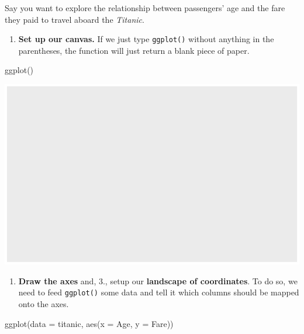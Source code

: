 \documentclass[
]{book}
\newenvironment{Shaded}{\begin{snugshade}}{\end{snugshade}}
\newcommand{\AttributeTok}[1]{\textcolor[rgb]{0.77,0.63,0.00}{#1}}
\newcommand{\FunctionTok}[1]{\textcolor[rgb]{0.00,0.00,0.00}{#1}}
\newcommand{\NormalTok}[1]{#1}
\providecommand{\tightlist}{%
  \setlength{\itemsep}{0pt}\setlength{\parskip}{0pt}}
\begin{document}
Say you want to explore the relationship between passengers' age and the fare they paid to travel aboard the \emph{Titanic}.

\begin{enumerate}
\def\labelenumi{(\arabic{enumi})}
\tightlist
\item
  \textbf{Set up our canvas.} If we just type \texttt{ggplot()} without anything in the parentheses, the function will just return a blank piece of paper.
\end{enumerate}

\begin{Shaded}
\begin{Highlighting}[]
\FunctionTok{ggplot}\NormalTok{()}
\end{Highlighting}
\end{Shaded}

\includegraphics{figures/unnamed-chunk-153-1.pdf}

\begin{enumerate}
\def\labelenumi{(\arabic{enumi})}
\setcounter{enumi}{1}
\tightlist
\item
  \textbf{Draw the axes} and, 3., setup our \textbf{landscape of coordinates}. To do so, we need to feed \texttt{ggplot()} some data and tell it which columns should be mapped onto the axes.
\end{enumerate}

\begin{Shaded}
\begin{Highlighting}[]
\FunctionTok{ggplot}\NormalTok{(}\AttributeTok{data =}\NormalTok{ titanic, }
       \FunctionTok{aes}\NormalTok{(}\AttributeTok{x =}\NormalTok{ Age, }\AttributeTok{y =}\NormalTok{ Fare))}
\end{Highlighting}
\end{Shaded}
\end{document}
